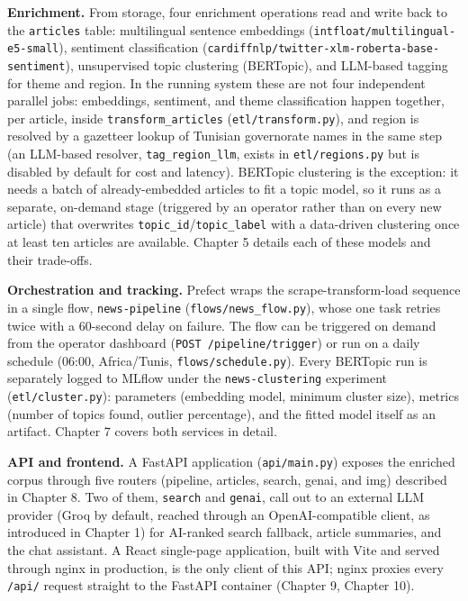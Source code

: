 \textbf{Enrichment.} From storage, four enrichment operations read and write back to the \texttt{articles} table: multilingual sentence embeddings (\texttt{intfloat/multilingual-e5-small}), sentiment classification (\texttt{cardiffnlp/twitter-xlm-roberta-base-sentiment}), unsupervised topic clustering (BERTopic), and LLM-based tagging for theme and region. In the running system these are not four independent parallel jobs: embeddings, sentiment, and theme classification happen together, per article, inside \texttt{transform\_articles} (\texttt{etl/transform.py}), and region is resolved by a gazetteer lookup of Tunisian governorate names in the same step (an LLM-based resolver, \texttt{tag\_region\_llm}, exists in \texttt{etl/regions.py} but is disabled by default for cost and latency). BERTopic clustering is the exception: it needs a batch of already-embedded articles to fit a topic model, so it runs as a separate, on-demand stage (triggered by an operator rather than on every new article) that overwrites \texttt{topic\_id}/\texttt{topic\_label} with a data-driven clustering once at least ten articles are available. Chapter 5 details each of these models and their trade-offs.

\textbf{Orchestration and tracking.} Prefect wraps the scrape-transform-load sequence in a single flow, \texttt{news-pipeline} (\texttt{flows/news\_flow.py}), whose one task retries twice with a 60-second delay on failure. The flow can be triggered on demand from the operator dashboard (\texttt{POST /pipeline/trigger}) or run on a daily schedule (06:00, Africa/Tunis, \texttt{flows/schedule.py}). Every BERTopic run is separately logged to MLflow under the \texttt{news-clustering} experiment (\texttt{etl/cluster.py}): parameters (embedding model, minimum cluster size), metrics (number of topics found, outlier percentage), and the fitted model itself as an artifact. Chapter 7 covers both services in detail.

\textbf{API and frontend.} A FastAPI application (\texttt{api/main.py}) exposes the enriched corpus through five routers (pipeline, articles, search, genai, and img) described in Chapter 8. Two of them, \texttt{search} and \texttt{genai}, call out to an external LLM provider (Groq by default, reached through an OpenAI-compatible client, as introduced in Chapter 1) for AI-ranked search fallback, article summaries, and the chat assistant. A React single-page application, built with Vite and served through nginx in production, is the only client of this API; nginx proxies every \texttt{/api/} request straight to the FastAPI container (Chapter 9, Chapter 10).

